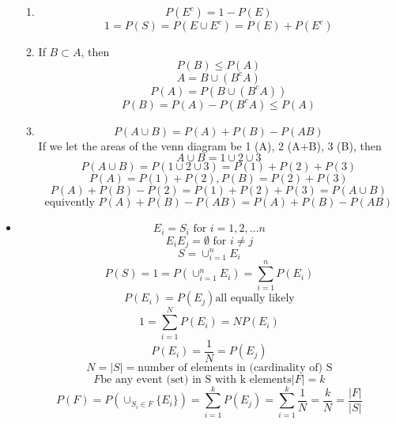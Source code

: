 \begin{itemize}
\begin{enumerate}
    \item \[ P(E^c) = 1 - P(E)\]
    \[ 1 = P(S) = P(E\cup E^c ) = P(E) + P(E^c)\]
    \item If $B \subset A$, then
    \[ P(B) \leq P(A)\]
    \[ A = B \cup (B^c A)\]
    \[ P(A) = P(B \cup (B^c A))\]
    \[ P(B) = P(A) - P(B^c A) \leq P(A)\]
    \item \[ P(A \cup B) = P(A) + P(B) - P(AB)\]
    If we let the areas of the venn diagram  be 1 (A), 2 (A+B), 3 (B), then
    \[ A \cup B = 1 \cup 2 \cup 3\]
    \[ P(A\cup B) = P(1 \cup 2 \cup 3) = P(1) + P(2) + P(3)\]
    \[ P(A) = P(1) + P(2), P(B) = P(2) + P(3)\]
    \[ P(A) + P(B) - P(2)  = P(1) + P(2) + P(3) = P(A \cup B)\]
    \[ \text{equivently } P(A) + P(B) - P(AB) = P(A) + P(B) - P(AB) \]
    \end{enumerate}
    \item \[ E_i = S_i \text{ for } i = 1, 2, ... n\]
    \[ E_i E_j = \emptyset \text{ for } i \neq j\]
    \[ S = \cup_{i=1}^{n} E_i\]
    \[ P(S) = 1 = P(\cup_{i=1}^{n} E_i) = \sum_{i=1}^{n} P(E_i)\]
    \[ P (E_i) = P(E_j) \text{all equally likely}\]
    \[ 1 = \sum_{i=1}^{N} P(E_i) = N P(E_i)\]
    \[ P(E_i) = \frac{1}{N} = P(E_j)\]
    \[ N = |S| = \text{number of elements in (cardinality of) S}\]
    \[ F \text{be any event (set) in S with k elements} |F| = k\]
    \[ P(F) = P(\cup_{S_i \in F} \{E_i\}) = \sum_{i=1}^{k} P(E_j) = \sum_{i=1}^{k} \frac{1}{N} = \frac{k}{N} = \frac{|F|}{|S|}\]


\end{itemize}
